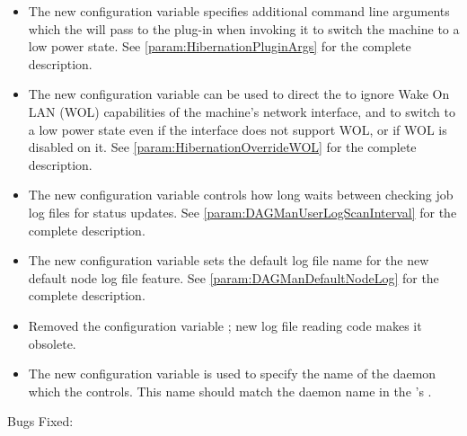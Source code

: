 \begin{itemize}
\item The new configuration variable 
  specifies additional command line arguments which the
   will pass to the plug-in when invoking it to
  switch the machine to a low power state.
  See \ref{param:HibernationPluginArgs} for the complete description.

\item The new configuration variable  can be
  used to direct the  to ignore Wake On LAN (WOL)
  capabilities of the machine's network interface, and to switch to a
  low power state even if the interface does not support WOL, or if
  WOL is disabled on it.
  See \ref{param:HibernationOverrideWOL} for the complete description.

\item The new configuration variable 
controls how long  waits between checking job log files
for status updates.
See \ref{param:DAGManUserLogScanInterval} for the complete description.

\item The new configuration variable  sets
the default log file name for the new 
default node log file feature.
See \ref{param:DAGManDefaultNodeLog}
for the complete description.

\item Removed the configuration variable
; new log file reading code makes it
obsolete.

\item The new configuration variable  is used
  to specify the name of the daemon which the  controls.
  This name should match the daemon name in the 's
  .

\end{itemize}

\noindent Bugs Fixed:

